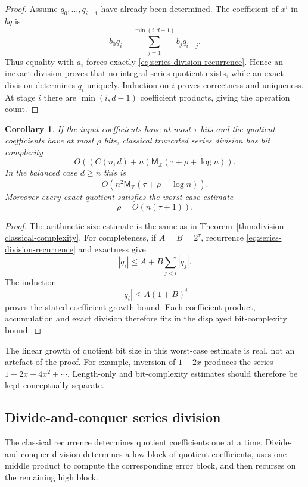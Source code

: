 \documentclass[11pt]{book}
\newtheorem{corollary}[theorem]{Corollary}
\theoremstyle{definition}
\newcommand{\ZZ}{\mathbb Z}
\newcommand{\MZ}{\mathsf M_{\ZZ}}
\begin{document}
\begin{proof}
Assume $q_0,\ldots,q_{i-1}$ have already been determined.  The coefficient of
$x^i$ in $bq$ is
\[
 b_0q_i+\sum_{j=1}^{\min(i,d-1)}b_jq_{i-j}.
\]
Thus equality with $a_i$ forces exactly
\eqref{eq:series-division-recurrence}.  Hence an inexact division proves that
no integral series quotient exists, while an exact division determines $q_i$
uniquely.  Induction on $i$ proves correctness and uniqueness.  At stage $i$
there are $\min(i,d-1)$ coefficient products, giving the operation count.
\end{proof}

\begin{corollary}\label{cor:series-classical-bit}
If the input coefficients have at most $\tau$ bits and the quotient
coefficients have at most $\rho$ bits, classical truncated series division has
bit complexity
\[
 O\!\left((C(n,d)+n)\MZ(\tau+\rho+\log n)\right).
\]
In the balanced case $d\geq n$ this is
\[
 O\!\left(n^2\MZ(\tau+\rho+\log n)\right).
\]
Moreover every exact quotient satisfies the worst-case estimate
\[
 \rho=O\!\left(n(\tau+1)\right).
\]
\end{corollary}

\begin{proof}
The arithmetic-size estimate is the same as in
Theorem~\ref{thm:division-classical-complexity}.  For completeness, if
$A=B=2^\tau$, recurrence \eqref{eq:series-division-recurrence} and exactness
give
\[
 |q_i|\leq A+B\sum_{j<i}|q_j|.
\]
The induction
\[
 |q_i|\leq A(1+B)^i
\]
proves the stated coefficient-growth bound.  Each coefficient product,
accumulation and exact division therefore fits in the displayed bit-complexity
bound.
\end{proof}

The linear growth of quotient bit size in this worst-case estimate is real, not
an artefact of the proof.  For example, inversion of $1-2x$ produces the
series $1+2x+4x^2+\cdots$.  Length-only and bit-complexity estimates should
therefore be kept conceptually separate.

\subsection{Divide-and-conquer series division}

The classical recurrence determines quotient coefficients one at a time.
Divide-and-conquer division determines a low block of quotient coefficients,
uses one middle product to compute the corresponding error block, and then
recurses on the remaining high block.
\end{document}
